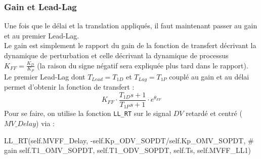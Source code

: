 \subsubsection{Gain et Lead-Lag}
Une fois que le délai et la translation appliqués, il faut maintenant passer au gain et au premier Lead-Lag.
\\Le gain est simplement le rapport du gain de la fonction de transfert décrivant la dynamique de perturbation et celle décrivant la dynamique de processus $K_{FF} = \frac{K_D}{K_P}$ (la raison du signe négatif sera expliquée plus tard dans le rapport).
\\Le premier Lead-Lag dont $T_{Lead} = T_{1D}$ et $T_{Lag} = T_{1P}$ couplé au gain et au délai permet d'obtenir la fonction de transfert : 
\[K_{FF}\cdot\frac{T_{1D}s + 1}{T_{1P}s + 1} \cdot e^{\theta_{FF}}\]
Pour se faire, on utilise la fonction \texttt{LL\_RT} sur le signal $DV$ retardé et centré ($MV\_Delay$) via : 
\begin{python*}
	LL_RT(self.MVFF_Delay, 
	-self.Kp_ODV_SOPDT/self.Kp_OMV_SOPDT, # gain
	self.T1_OMV_SOPDT, 
	self.T1_ODV_SOPDT, 
	self.Ts, 
	self.MVFF_LL1)
\end{python*}


